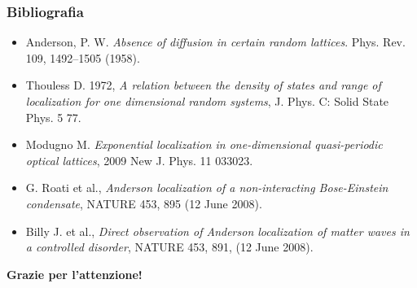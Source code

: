 \documentclass[10pt, t]{beamer}
\begin{document}
\begin{frame}
\begin{columns}
\begin{center}
\end{center}
 
\end{columns}
\end{frame}


\begin{frame}
\frametitle{Bibliografia}
\begin{itemize}
\item Anderson, P. W. \emph{Absence of diffusion in certain random 
lattices}. Phys. Rev. 109, 1492–1505 (1958).
\item Thouless D. 1972, \emph{A relation between the density of states and range of localization for one dimensional random systems}, J. Phys. C: Solid State Phys. 5 77.
\item Modugno M. \emph{Exponential localization in one-dimensional quasi-periodic optical lattices}, 2009 New J. Phys. 11 033023.
\item G. Roati et al., \emph{Anderson localization of a non-interacting Bose-Einstein condensate}, NATURE 453, 895 (12 June 2008).
\item Billy J. et al., \emph{Direct observation of Anderson localization of matter waves in a controlled disorder}, NATURE 453, 891, (12 June 2008).

\end{itemize}

\begin{center}
\textbf{Grazie per l'attenzione!}
\end{center}
\end{frame}
\end{document}
